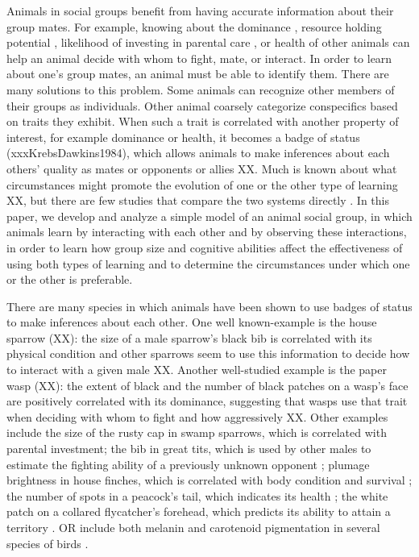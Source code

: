 Animals in social groups benefit from having accurate information about their group mates. For example, knowing about the dominance \cite{Hobson:2015kx,Hobson:2015uq,Flack:2006fk,Brush:2013fk,Flack:2006uq,Cowlishaw:1990vn,Waal:1986ys}, resource holding potential \cite{Arnott:2009zr,Lemel:1993ve,Dick:1990cr}, likelihood of investing in parental care \cite{Olsen:2010uq,Qvarnstrom:1997fk}, or health \cite{Folstad:1992kx,Loyau:2005nx} of other animals can help an animal decide with whom to fight, mate, or interact. In order to learn about one's group mates, an animal must be able to identify them. There are many solutions to this problem. Some animals can recognize other members of their groups as individuals. Other animal coarsely categorize conspecifics based on traits they exhibit. When such a trait is correlated with another property of interest, for example dominance or health, it becomes a badge of status (xxxKrebsDawkins1984), which allows animals to make inferences about each others' quality as mates or opponents or allies XX. Much is known about what circumstances might promote the evolution of one or the other type of learning XX, but there are few studies that compare the two systems directly \cite{sheehan2016evotradeoff}. In this paper, we develop and analyze a simple model of an animal social group, in which animals learn by interacting with each other and by observing these interactions, in order to learn how group size and cognitive abilities affect the effectiveness of using both types of learning and to determine the circumstances under which one or the other is preferable. 

There are many species in which animals have been shown to use badges of status to make inferences about each other. One well known-example is the house sparrow (XX): the size of a male sparrow's black bib is correlated with its physical condition and other sparrows seem to use this information to decide how to interact with a given male XX. Another well-studied example is the paper wasp (XX): the extent of black and the number of black patches on a wasp's face are positively correlated with its dominance, suggesting that wasps use that trait when deciding with whom to fight and how aggressively \cite{Tibbetts:2004kx}XX. Other examples include the size of the rusty cap in swamp sparrows, which is correlated with parental investment\cite{Olsen:2010uq}; the bib in great tits, which is used by other males to estimate the fighting ability of a previously unknown opponent \cite{Lemel:1993ve}; plumage brightness in house finches, which is correlated with body condition and survival \cite{McGraw:2000qf}; the number of spots in a peacock's tail, which indicates its health \cite{Loyau:2005nx}; the white patch on a collared flycatcher's forehead, which predicts its ability to attain a territory \cite{Part:1997ys}. OR include both melanin and carotenoid pigmentation in several species of birds \cite{Olsen:2010uq,Lemel:1993ve,McGraw:2000qf,Young:2015dq,Jawor:2003bh}. 


